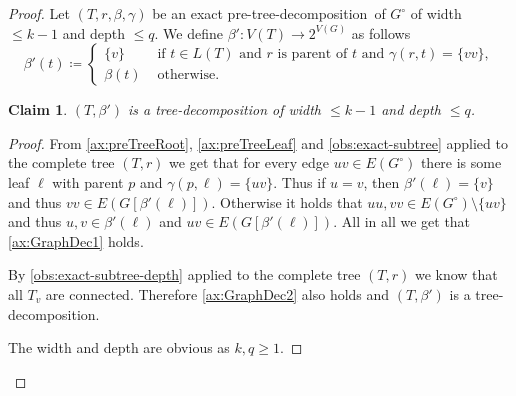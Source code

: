 \documentclass{lmcs}
\theoremstyle{plain}\newtheorem{claim}[thm]{Claim}   %
\newenvironment{claimproof}{\begin{proof}}{\renewcommand{\qedsymbol}{\ensuremath{\blacksquare}}\end{proof}}
\newcommand{\preTreeDec}{pre-tree-decomposition}
\begin{document}
\begin{proof}
	Let $(T,r,\beta,\gamma)$ be an exact \preTreeDec\ of $G^\circ$ of width $\leq k-1$ and depth $\leq q$.
	We define $\beta'\colon V(T)\rightarrow 2^{V(G)}$ as follows
	\begin{equation*}
		\beta'(t)\coloneqq\begin{cases}
			\{v\} & \text{ if } t\in L(T) \text{ and } r \text{ is parent of } t \text{ and } \gamma(r,t)=\{vv\},\\
			\beta(t) & \text{ otherwise.}
		\end{cases}
	\end{equation*}
	\begin{claim}
		$(T,\beta')$ is a tree-decomposition of width $\leq k-1$ and depth $\leq q$.
	\end{claim}
	\begin{claimproof}
		From \ref{ax:preTreeRoot}, \ref{ax:preTreeLeaf} and \autoref{obs:exact-subtree} applied to the complete tree $(T,r)$ we get that for every edge $uv\in E(G^\circ)$ there is some leaf $\ell$ with parent $p$ and $\gamma(p,\ell)=\{uv\}$.
		Thus if $u=v$, then $\beta'(\ell)=\{v\}$ and thus $vv\in E(G[\beta'(\ell)])$.
		Otherwise it holds that $uu,vv\in E(G^\circ)\setminus \{uv\}$ and thus $u,v\in\beta'(\ell)$ and $uv\in E(G[\beta'(\ell)])$.
		All in all we get that \ref{ax:GraphDec1} holds.
		
		By \autoref{obs:exact-subtree-depth} applied to the complete tree $(T,r)$ we know that all $T_v$ are connected.
		Therefore \ref{ax:GraphDec2} also holds and $(T,\beta')$ is a tree-decomposition.
		
		The width and depth are obvious as $k,q\geq 1$.
	\end{claimproof}
	

\end{proof}
\end{document}
